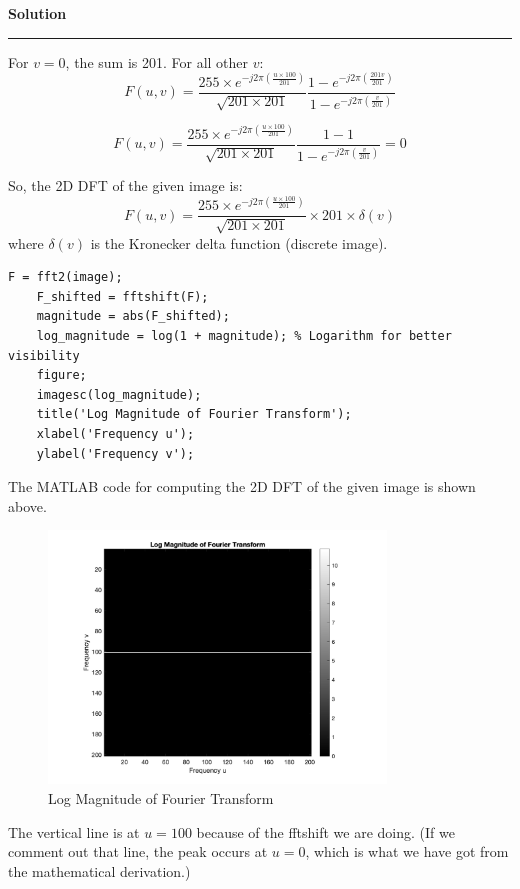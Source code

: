 \documentclass[a4paper]{article}
\newenvironment{solution}[2][]{%
    \begin{mdframed}[linecolor=green!60!black, linewidth=2pt, roundcorner=10pt, backgroundcolor=green!5!white, skipabove=12pt, skipbelow=12pt]%
        \textbf{\large #2} %
        \par\noindent\rule{\textwidth}{0.4pt} %
        \vspace{0.5em} %
}{%
    \end{mdframed}%
}
\begin{document}
\begin{solution}{Solution}
For $v = 0$, the sum is 201. For all other $v$:
\begin{equation}
    F(u, v) = \frac{255\times e^{-j2\pi\left(\frac{u\times 100}{201}\right)}}{\sqrt{201\times 201}} \frac{1-e^{-j2\pi\left(\frac{201v}{201}\right)}}{1-e^{-j2\pi\left(\frac{v}{201}\right)}}
\end{equation}

\begin{equation}
    F(u, v) = \frac{255\times e^{-j2\pi\left(\frac{u\times 100}{201}\right)}}{\sqrt{201\times 201}} \frac{1-1}{1-e^{-j2\pi\left(\frac{v}{201}\right)}} = 0
\end{equation}

So, the 2D DFT of the given image is:
\begin{equation}
    F(u, v) = \frac{255\times e^{-j2\pi\left(\frac{u\times 100}{201}\right)}}{\sqrt{201\times 201}} \times 201 \times \delta(v)
\end{equation}
where $\delta(v)$ is the Kronecker delta function (discrete image).
\begin{lstlisting}[style=Matlab,caption={MATLAB code for Fourier Transform}]    
    F = fft2(image);
    F_shifted = fftshift(F);
    magnitude = abs(F_shifted);
    log_magnitude = log(1 + magnitude); % Logarithm for better visibility
    figure;
    imagesc(log_magnitude);
    title('Log Magnitude of Fourier Transform');
    xlabel('Frequency u');
    ylabel('Frequency v');
\end{lstlisting}

\clearpage
The MATLAB code for computing the 2D DFT of the given image is shown above.


\begin{figure}[H]
    \centering
    \includegraphics[width=0.8\textwidth]{../images/fourier_log_magnitude_image.png}
    \caption{Log Magnitude of Fourier Transform}
    \label{fig:fft}
\end{figure}


The vertical line is at $u = 100$ because of the fftshift we are doing. (If we comment out that line, the peak occurs at $u = 0$, which is what we have got from the mathematical derivation.)

\end{solution}
\end{document}
